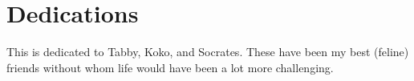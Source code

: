 \chapter{Dedications}
This is dedicated to Tabby, Koko, and Socrates.
These have been my best (feline) friends without whom life would have been a lot more challenging.